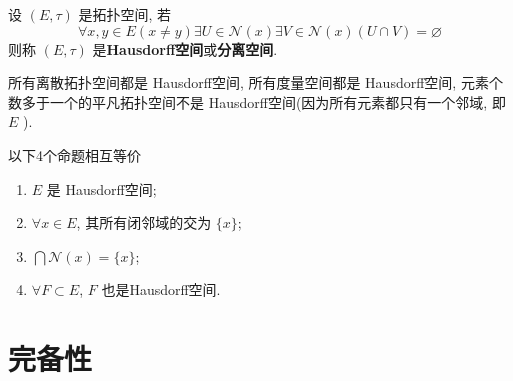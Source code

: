  \begin{Def}[Hausdorff空间]\label{def:Hausdorff空间}
       设 $ (E, \tau) $ 是拓扑空间, 若 
       \[
          \forall x, y\in E(x\neq y)\exists U\in \mathcal{N}(x)\exists V\in\mathcal{N}(x) (U\cap V)=\varnothing
       \]
       则称 $ (E, \tau) $ 是\textbf{Hausdorff空间}或\textbf{分离空间}. 
 \end{Def}
 \begin{Ex}
      所有离散拓扑空间都是 Hausdorff空间, 所有度量空间都是 Hausdorff空间, 元素个数多于一个的平凡拓扑空间不是 Hausdorff空间(因为所有元素都只有一个邻域, 即 $ E $ ). 
 \end{Ex}
 \begin{Prop}
      以下4个命题相互等价
      \begin{enumerate}[(1)]
           \item  $ E $ 是 Hausdorff空间;
           \item $ \forall x\in E $, 其所有闭邻域的交为 $\{ x \}$;
           \item $\bigcap \mathcal{N}(x)=\{x\}$;
           \item $ \forall F\subset E $, $ F $ 也是Hausdorff空间. 
      \end{enumerate}
 \end{Prop}
 
 \section{完备性}
